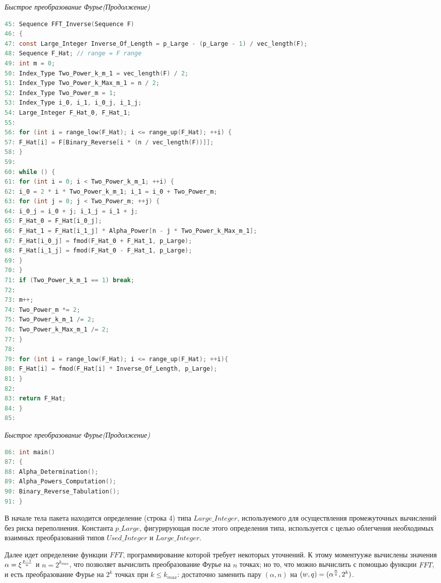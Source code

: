 \documentclass{mai_book}
\begin{document}
\textit{Быстрое преобразование Фурье(Продолжение)}
\begin{lstlisting}[language=C,
basicstyle=\scriptsize,
linewidth=7cm,
belowskip=-1em,
mathescape=true]
45: Sequence FFT_Inverse(Sequence F)
46: {
47: const Large_Integer Inverse_Of_Length = p_Large - (p_Large - 1) / vec_length(F);
48: Sequence F_Hat; // range = F range
49: int m = 0;
50: Index_Type Two_Power_k_m_1 = vec_length(F) / 2;
51: Index_Type Two_Power_k_Max_m_1 = n / 2;
52: Index_Type Two_Power_m = 1;
53: Index_Type i_0, i_1, i_0_j, i_1_j;
54: Large_Integer F_Hat_0, F_Hat_1;
55:
56: for (int i = range_low(F_Hat); i <= range_up(F_Hat); ++i) {
57: F_Hat[i] = F[Binary_Reverse[i * (n / vec_length(F))]];
58: }
59:
60: while () {
61: for (int i = 0; i < Two_Power_k_m_1; ++i) {
62: i_0 = 2 * i * Two_Power_k_m_1; i_1 = i_0 + Two_Power_m;
63: for (int j = 0; j < Two_Power_m; ++j) {
64: i_0_j = i_0 + j; i_1_j = i_1 + j;
65: F_Hat_0 = F_Hat[i_0_j];
66: F_Hat_1 = F_Hat[i_1_j] * Alpha_Power[n - j * Two_Power_k_Max_m_1];
67: F_Hat[i_0_j] = fmod(F_Hat_0 + F_Hat_1, p_Large);
68: F_Hat[i_1_j] = fmod(F_Hat_0 - F_Hat_1, p_Large);
69: }
70: }
71: if (Two_Power_k_m_1 == 1) break;
72:
73: m++;
74: Two_Power_m *= 2;
75: Two_Power_k_m_1 /= 2;
76: Two_Power_k_Max_m_1 /= 2;
77: }
78:
79: for (int i = range_low(F_Hat); i <= range_up(F_Hat); ++i){
80: F_Hat[i] = fmod(F_Hat[i] * Inverse_Of_Length, p_Large);
81: }
82:
83: return F_Hat;
84: }
85:
\end{lstlisting}	
	
	\newpage
   	
\textit{Быстрое преобразование Фурье(Продолжение)}
\begin{lstlisting}[language=C,
basicstyle=\scriptsize,
linewidth=7cm,
belowskip=-1em,
mathescape=true]
86: int main()
87: {
88: Alpha_Determination();
89: Alpha_Powers_Computation();
90: Binary_Reverse_Tabulation();
91: }
\end{lstlisting}   

\bigskip	
   	
	В начале тела пакета находится определение (строка 4) типа $Large \_ Integer$, используемого для осуществления промежуточных вычислений без риска переполнения. Константа $p \_ Large$, фигурирующая после этого определения типа, используется с целью облегчения необходимых взаимных преобразований типов $Used \_ Integer$ и $Large \_ Integer$.
	
	Далее идет определение функции $FFT$, программирование которой требует некоторых уточнений. К этому моментууже вычислены значения $\alpha = \xi^{p-1 \over n}$ и $n = 2^{k_{max}}$, что позволяет вычислить преобразование Фурье на $n$ точках; но то, что можно вычислить с помощью функции $FFT$, и есть преобразование Фурье на $2^k$ точках при $k \leq k_{max}$:  достаточно заменить пару $(\alpha, n)$ на $(w, q) = (\alpha^{n \over q}, 2^k)$.
	
\end{document}
